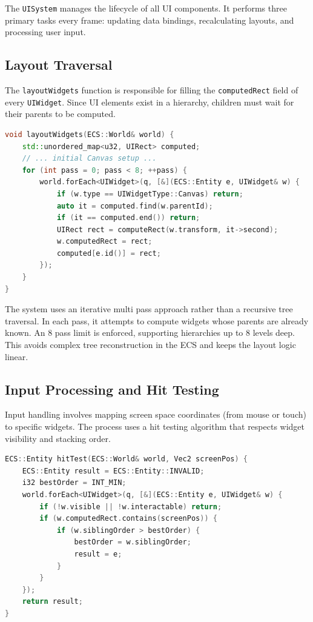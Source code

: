 The \texttt{UISystem} manages the lifecycle of all UI components. It performs three primary tasks every frame: updating data bindings, recalculating layouts, and processing user input.

\subsection{Layout Traversal}

The \texttt{layoutWidgets} function is responsible for filling the \texttt{computedRect} field of every \texttt{UIWidget}. Since UI elements exist in a hierarchy, children must wait for their parents to be computed.

\begin{lstlisting}[language=C++]
void layoutWidgets(ECS::World& world) {
    std::unordered_map<u32, UIRect> computed;
    // ... initial Canvas setup ...
    for (int pass = 0; pass < 8; ++pass) {
        world.forEach<UIWidget>(q, [&](ECS::Entity e, UIWidget& w) {
            if (w.type == UIWidgetType::Canvas) return;
            auto it = computed.find(w.parentId);
            if (it == computed.end()) return;
            UIRect rect = computeRect(w.transform, it->second);
            w.computedRect = rect;
            computed[e.id()] = rect;
        });
    }
}
\end{lstlisting}

The system uses an iterative multi pass approach rather than a recursive tree traversal. In each pass, it attempts to compute widgets whose parents are already known. An 8 pass limit is enforced, supporting hierarchies up to 8 levels deep. This avoids complex tree reconstruction in the ECS and keeps the layout logic linear.

\subsection{Input Processing and Hit Testing}

Input handling involves mapping screen space coordinates (from mouse or touch) to specific widgets. The process uses a hit testing algorithm that respects widget visibility and stacking order.

\begin{lstlisting}[language=C++]
ECS::Entity hitTest(ECS::World& world, Vec2 screenPos) {
    ECS::Entity result = ECS::Entity::INVALID;
    i32 bestOrder = INT_MIN;
    world.forEach<UIWidget>(q, [&](ECS::Entity e, UIWidget& w) {
        if (!w.visible || !w.interactable) return;
        if (w.computedRect.contains(screenPos)) {
            if (w.siblingOrder > bestOrder) {
                bestOrder = w.siblingOrder;
                result = e;
            }
        }
    });
    return result;
}
\end{lstlisting}

